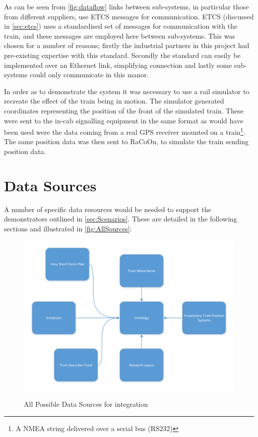 As can be seen from \autoref{fig:dataflow} links between sub-systems, in particular those from different suppliers, use ETCS messages for communication. ETCS (discussed in \autoref{sec:etcs}) uses a standardised set of messages for communication with the train, and these messages are employed here between sub-systems. This was chosen for a number of reasons; firstly the industrial partners in this project had pre-existing expertise with this standard. Secondly the standard can easily be implemented over an Ethernet link, simplifying connection and lastly some sub-systems could only communicate in this manor. 

In order as to demonstrate the system it was necessary to use a rail simulator to recreate the effect of the train being in motion. The simulator generated coordinates representing the position of the front of the simulated train. These were sent to the in-cab signalling equipment in the same format as would have been used were the data coming from a real GPS receiver mounted on a train\footnote{A NMEA string delivered over a serial bus (RS232)}. The same position data was then sent to RaCoOn, to simulate the train sending position data. 


\section{Data Sources}

A number of specific data resources would be needed to support the demonstrators outlined in \autoref{sec:Scenarios}. These are detailed in the following sections and illustrated in \autoref{fig:AllSources}:

\begin{figure}[h]
\myfloatalign
{\includegraphics[width=\linewidth]{gfx/DataflowStirAllOptionsDemo}} 
\caption{All Possible Data Sources for integration}
\label{fig:AllSources}
\end{figure}


